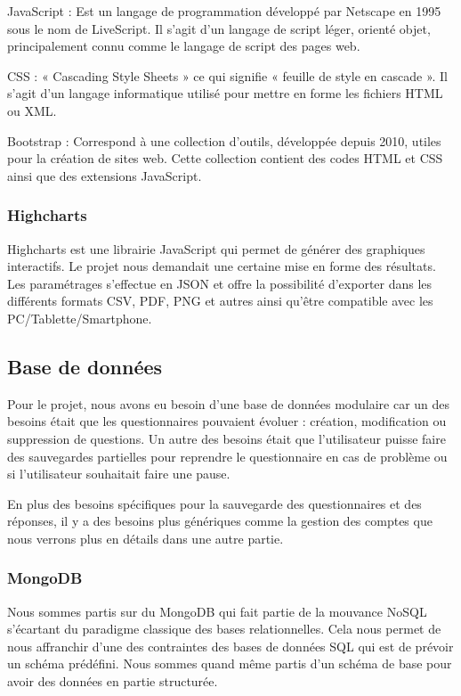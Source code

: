 JavaScript : Est un langage de programmation développé par Netscape en 1995 sous le nom de LiveScript. Il s'agit d'un langage de script léger, orienté objet, principalement connu comme le langage de script des pages web. \

CSS : « Cascading Style Sheets » ce qui signifie « feuille de style en cascade ». 
Il s'agit d'un langage informatique utilisé pour mettre en forme les fichiers HTML ou XML. \

Bootstrap : Correspond à une collection d'outils, développée depuis 2010, utiles pour la création de sites web. Cette collection contient des codes HTML et CSS ainsi que des extensions JavaScript. \
  

\subsubsection{Highcharts}

Highcharts est une librairie JavaScript qui permet de générer des graphiques interactifs. Le projet nous demandait une certaine mise en forme des résultats. Les paramétrages s'effectue en JSON et offre la possibilité d'exporter dans les différents formats CSV, PDF, PNG et autres ainsi qu'être compatible avec les PC/Tablette/Smartphone.

\subsection{Base de données}

Pour le projet, nous avons eu besoin d'une base de données modulaire car un des besoins était que les questionnaires pouvaient évoluer : création, modification ou suppression de questions. Un autre des besoins était que l'utilisateur puisse faire des sauvegardes partielles pour reprendre le questionnaire en cas de problème ou si l'utilisateur souhaitait faire une pause. 

En plus des besoins spécifiques pour la sauvegarde des questionnaires et des réponses, il y a des besoins plus génériques comme la gestion des comptes que nous verrons plus en détails dans une autre partie.

\subsubsection{MongoDB}

Nous sommes partis sur du MongoDB qui fait partie de la mouvance NoSQL s'écartant du paradigme classique des bases relationnelles. Cela nous permet de nous affranchir d'une des contraintes des bases de données SQL qui est de prévoir un schéma prédéfini. Nous sommes quand même partis d'un schéma de base pour avoir des données en partie structurée.

